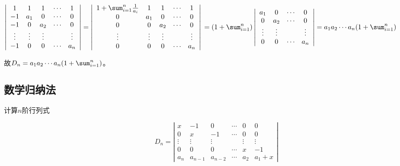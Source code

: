\begin{solution}
$\left|\begin{array}{ccccccc}
        1      & 1      & 1      & \cdots & 1      \\
        -1     & a_{1}  & 0      & \cdots & 0      \\
        -1     & 0      & a_{2}  & \cdots & 0      \\
        \vdots & \vdots & \vdots &        & \vdots \\
        -1     & 0      & 0      & \cdots & a_{n}
    \end{array}\right|
    =\left|\begin{array}{ccccccc}
        1+\sum_{i=1}^{n}\frac{1}{a_{i}} & 1      & 1      & \cdots & 1      \\
        0                               & a_{1}  & 0      & \cdots & 0      \\
        0                               & 0      & a_{2}  & \cdots & 0      \\
        \vdots                          & \vdots & \vdots &        & \vdots \\
        0                               & 0      & 0      & \cdots & a_{n}
    \end{array}\right| \\
    =\qty(1+\sum_{i=1}^{n})
    \left|\begin{array}{ccccccc}
        a_{1}  & 0      & \cdots & 0      \\
        0      & a_{2}  & \cdots & 0      \\
        \vdots & \vdots &        & \vdots \\
        0      & 0      & \cdots & a_{n}
    \end{array}\right|
    =a_{1}a_{2}\cdots a_{n}\qty(1+\sum_{i=1}^{n})
$

故$D_{n}=a_{1}a_{2}\cdots a_{n}\qty(1+\sum_{i=1}^{n})$。
\end{solution}

\subsection{数学归纳法}

\begin{example}
    计算$n$阶行列式

$$D_{n}=\left|\begin{array}{ccccccc}
        x      & -1      & 0       & \cdots & 0      & 0       \\
        0      & x       & -1      & \cdots & 0      & 0       \\
        \vdots & \vdots  & \vdots  &        & \vdots & \vdots  \\
        0      & 0       & 0       & \cdots & x      & -1      \\
        a_{n}  & a_{n-1} & a_{n-2} & \cdots & a_{2}  & a_{1}+x
    \end{array}\right|$$
\end{example}

